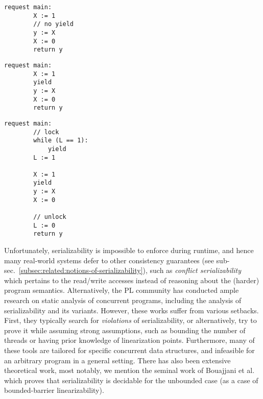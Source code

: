 \noindent
\begin{minipage}[t]{0.45\textwidth}
	\begin{minipage}[t]{\textwidth}
		\begin{lstlisting}[caption={Without yield or lock (serializable)},
			label={lst:MotivatingExample1Ser}]
    request main: 
        X := 1 
        // no yield
        y := X 
        X := 0
        return y 
		\end{lstlisting}
	\end{minipage}
	\vspace{1em}
	\begin{minipage}[t]{\textwidth}
		\begin{lstlisting}[caption={With yield (not serializable)},
			label={lst:MotivatingExample2NonSer}]
    request main: 
        X := 1 
        yield 
        y := X 
        X := 0
        return y 	
		\end{lstlisting}
	\end{minipage}
\end{minipage}%
\hfill
\begin{minipage}[t]{0.45\textwidth}
	\begin{lstlisting}[caption={With yield and lock (serializable)},
		label={lst:MotivatingExample3Ser}]
    request main: 
        // lock
        while (L == 1): 
            yield
        L := 1 

        X := 1
        yield
        y := X 
        X := 0

        // unlock    
        L := 0
        return y 
	\end{lstlisting}
\end{minipage}



Unfortunately, serializability is impossible to enforce during runtime, and hence many real-world systems defer to other consistency guarantees (see sub-sec.~\ref{subsec:related:notions-of-serializability}), such as \textit{conflict serializability} which pertains to the read/write accesses instead of reasoning about the (harder) program semantics. Alternatively, the PL community has conducted ample research on static analysis of concurrent programs, including the analysis of serializability and its variants. However, these works suffer from various setbacks. First, they typically search for \textit{violations} of serializability, or alternatively, try to prove it while assuming strong assumptions, such as bounding the number of threads or having prior knowledge of linearization points.
Furthermore, many of these tools are tailored for specific concurrent data structures, and infeasible for an arbitrary program in a general setting.
%
There has also been extensive theoretical work, most notably, we mention the seminal work of Bouajjani et al.~\cite{BoEmEnHa13} which proves that serializability is decidable for the unbounded case (as a case of bounded-barrier linearizability).


